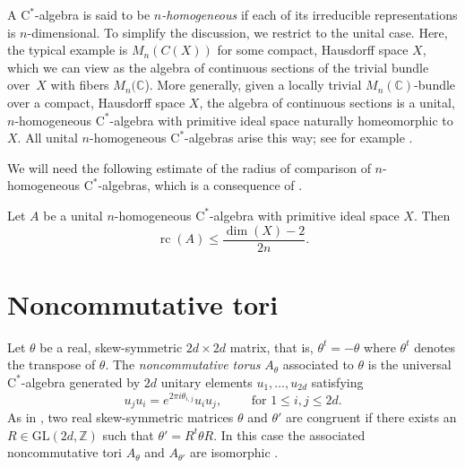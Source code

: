 \documentclass[reqno, a4paper]{amsart}
\numberwithin{equation}{section}
\newcommand{\Z}{\mathbb{Z}}   %
\newcommand{\C}{\mathbb{C}}   %
\newcommand{\ca}{$\mathrm{C}^*$-algebra}
\DeclareMathOperator{\rc}{rc}
\begin{document}
A \ca{} is said to be \emph{$n$-homogeneous} if each of its irreducible representations is $n$-dimensional.
To simplify the discussion, we restrict to the unital case.
Here, the typical example is $M_n(C(X))$ for some compact, Hausdorff space $X$, which we can view as the algebra of continuous sections of the trivial bundle over~$X$ with fibers $M_n(\C$).
More generally, given a locally trivial $M_n(\C)$-bundle over a compact, Hausdorff space $X$, the algebra of continuous sections is a unital, $n$-homogeneous \ca{} with primitive ideal space naturally homeomorphic to $X$. All unital $n$-homogeneous \ca{s} arise this way;
see for example \cite[Theorem~IV.1.7.23]{Bla06OpAlgs}.

We will need the following estimate of the radius of comparison of $n$-homogeneous \ca{s}, which is a consequence of \cite[Theorem~4.6]{Tom09CompThe}.

\begin{proposition}[Toms]
\label{prop:radius-homogeneous}
Let $A$ be a unital $n$-homogeneous \ca{} with primitive ideal space $X$. 
Then
\[ 
\rc(A) \leq \frac{\dim(X)-2}{2n}. 
\]
\end{proposition}




\section{Noncommutative tori}

Let $\theta$ be a real, skew-symmetric $2d \times 2d$ matrix, that is, $\theta^t = -\theta$ where $\theta^t$ denotes the transpose of $\theta$. 
The \emph{noncommutative torus} $A_{\theta}$ associated to $\theta$ is the universal \ca{} generated by $2d$ unitary elements $u_1, \ldots, u_{2d}$ satisfying
\begin{equation}
\label{eq:nc-torus-relations}
u_j u_i = e^{2\pi i \theta_{i,j}} u_i u_j, 
\qquad \text{ for } 1 \leq i,j \leq 2d.
\end{equation}
As in , two real skew-symmetric matrices $\theta$ and $\theta'$ are congruent if there exists an $R \in \mathrm{GL}(2d,\Z)$ such that $\theta' = R^t \theta R$. In this case the associated noncommutative tori $A_\theta$ and $A_{\theta'}$ are isomorphic \cite[p.\ 293]{RiSc99}.
\end{document}
